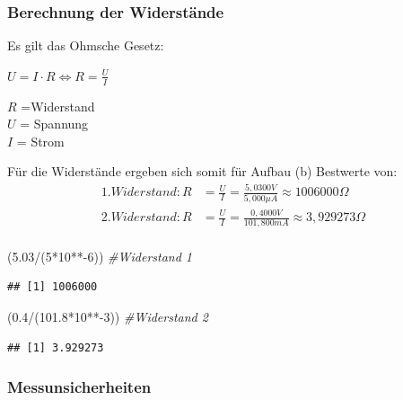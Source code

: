 \documentclass[
  9pt,
]{article}
\newenvironment{Shaded}{\begin{snugshade}}{\end{snugshade}}
\newcommand{\CommentTok}[1]{\textcolor[rgb]{0.56,0.35,0.01}{\textit{#1}}}
\newcommand{\DecValTok}[1]{\textcolor[rgb]{0.00,0.00,0.81}{#1}}
\newcommand{\FloatTok}[1]{\textcolor[rgb]{0.00,0.00,0.81}{#1}}
\newcommand{\NormalTok}[1]{#1}
\newcommand{\SpecialCharTok}[1]{\textcolor[rgb]{0.00,0.00,0.00}{#1}}
\begin{document}
\hypertarget{berechnung-der-widerstuxe4nde-1}{%
\subsubsection{Berechnung der
Widerstände}\label{berechnung-der-widerstuxe4nde-1}}

Es gilt das Ohmsche Gesetz:

\(U=I\cdot R \Leftrightarrow R = \frac{U}{I}\)

\noindent \(R\) =Widerstand\\
\noindent \(U\) = Spannung\\
\noindent \(I\) = Strom

Für die Widerstände ergeben sich somit für Aufbau (b) Bestwerte von:
\begin{equation*}
\begin{split}
1. Widerstand: R&=\frac{U}{I} = \frac {5,0300V}{5,000 \mu A} \approx 1006000 \Omega \\
2.Widerstand: R&=\frac{U}{I} = \frac {0,4000V}{101,800 mA} \approx 3,929273 \Omega \\
\end{split}
\end{equation*}

\begin{Shaded}
\begin{Highlighting}[]
\NormalTok{(}\FloatTok{5.03}\SpecialCharTok{/}\NormalTok{(}\DecValTok{5}\SpecialCharTok{*}\DecValTok{10}\SpecialCharTok{**{-}}\DecValTok{6}\NormalTok{)) }\CommentTok{\#Widerstand 1}
\end{Highlighting}
\end{Shaded}

\begin{verbatim}
## [1] 1006000
\end{verbatim}

\begin{Shaded}
\begin{Highlighting}[]
\NormalTok{(}\FloatTok{0.4}\SpecialCharTok{/}\NormalTok{(}\FloatTok{101.8}\SpecialCharTok{*}\DecValTok{10}\SpecialCharTok{**{-}}\DecValTok{3}\NormalTok{)) }\CommentTok{\#Widerstand 2}
\end{Highlighting}
\end{Shaded}

\begin{verbatim}
## [1] 3.929273
\end{verbatim}

\hypertarget{messunsicherheiten-1}{%
\subsubsection{Messunsicherheiten}\label{messunsicherheiten-1}}
\end{document}
